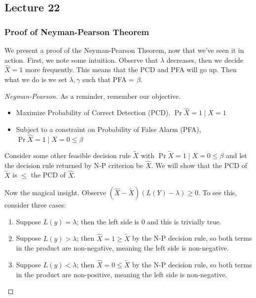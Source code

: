 \subsection{Lecture 22}
\subsubsection{Proof of Neyman-Pearson Theorem}

We present a proof of the Neyman-Pearson Theorem, now that we've seen it in action. First, we note some intuition.
Observe that  $\lambda$ decreases, then we decide $\hat{X} = 1$ more frequently. This means that the PCD and PFA will go up.
Then what we do is we set $\lambda, \gamma$ such that PFA = $\beta$.

\begin{proof}[Neyman-Pearson]
    As a reminder, remember our objective.
    \begin{itemize}
        \item Maximize Probability of Correct Detection (PCD), $\Pr{\hat{X} = 1 \mid X = 1}$
        \item Subject to a constraint on Probability of False Alarm (PFA), $\Pr{\hat{X} = 1 \mid X = 0} \leq \beta$
    \end{itemize}

    Consider some other feasible decision rule $\tilde{X}$ with $\Pr{\tilde{X} = 1 \mid X = 0} \leq \beta$ and let the decision rule
    returned by N-P criterion be $\hat{X}$. We will show that the PCD of $\tilde{X}$ is
    $\leq$ the PCD of $\hat{X}$.

    Now the magical insight. Observe $(\hat{X} - \tilde{X})(L(Y) - \lambda) \geq 0$. To see this, consider three cases:
    \begin{enumerate}
    \item Suppose $L(y) = \lambda$; then the left side is 0 and this is trivially true.
    \item Suppose $L(y) > \lambda$; then $\hat{X} = 1 \geq \tilde{X}$ by the N-P decision rule, so both terms in the product are non-negative, meaning the left side is non-negative.
    \item Suppose $L(y) < \lambda$; then $\hat{X} = 0 \leq \tilde{X}$ by the N-P decision rule, so both terms in the product are non-positive, meaning the left side is non-negative.
    \end{enumerate}


\end{proof}
